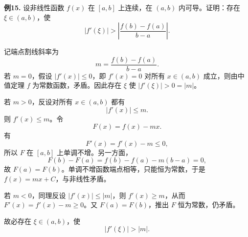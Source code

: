 \begin{problemblock}
\textbf{例15.} 设非线性函数 \(f(x)\) 在 \([a,b]\) 上连续，在 \((a,b)\) 内可导。证明：存在 \(\xi\in(a,b)\)，使
\[
|f'(\xi)|>\left|\frac{f(b)-f(a)}{b-a}\right|.
\]
\end{problemblock}
\begin{solutionblock}
记端点割线斜率为
\[
m=\frac{f(b)-f(a)}{b-a}.
\]
若 \(m=0\)，假设 \(|f'(x)|\le0\)，即 \(f'(x)=0\) 对所有 \(x\in(a,b)\) 成立，则由中值定理 \(f\) 为常数函数，矛盾。因此存在 \(\xi\) 使 \(|f'(\xi)|>0=|m|\)。

若 \(m>0\)，反设对所有 \(x\in(a,b)\) 都有
\[
|f'(x)|\le m.
\]
则 \(f'(x)\le m\)。令
\[
F(x)=f(x)-mx.
\]
有
\[
F'(x)=f'(x)-m\le0,
\]
所以 \(F\) 在 \([a,b]\) 上单调不增。另一方面，
\[
F(b)-F(a)=f(b)-f(a)-m(b-a)=0,
\]
故 \(F(a)=F(b)\)。单调不增函数端点相等，只能恒为常数，于是 \(f(x)=mx+C\)，与非线性矛盾。

若 \(m<0\)，同理反设 \(|f'(x)|\le|m|\)，则 \(f'(x)\ge m\)，从而 \(F'(x)=f'(x)-m\ge0\)。又 \(F(a)=F(b)\)，推出 \(F\) 恒为常数，仍矛盾。

故必存在 \(\xi\in(a,b)\)，使
\[
|f'(\xi)|>|m|.
\]
\end{solutionblock}

